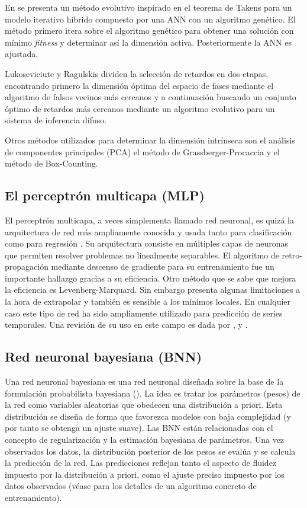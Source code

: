 \documentclass{llncs}
\begin{document}
En \cite{ferreira2008new} se presenta un método evolutivo inspirado en el teorema de Takens para un modelo iterativo híbrido compuesto por una ANN con un algoritmo genético. El método primero itera sobre el algoritmo genético para obtener una solución con mínimo \emph{fitness} y determinar así la dimensión activa. Posteriormente la ANN es ajustada. 

Lukoseviciute y Ragulskis \cite{lukoseviciute2010evolutionary} dividen la selección de retardos en dos etapas, encontrando primero la dimensión óptima del espacio de fases mediante el algoritmo de falsos vecinos más cercanos y a continuación buscando un conjunto óptimo de retardos más cercanos mediante un algoritmo evolutivo para un sistema de inferencia difuso.

Otros métodos utilizados para determinar la dimensión intrínseca son el análisis de componentes principales (PCA) el método de Grassberger-Procaccia \cite{grassberger2004measuring} y  el método de Box-Counting. 


\subsection{El perceptrón multicapa (MLP)}

El perceptrón multicapa, a veces simplementa llamado red neuronal, es quizá la arquitectura de red más ampliamente conocida y usada tanto para clasificación como para regresión \cite{bishop1995neural}. Su arquitectura consiste en múltiples capas de neuronas que permiten resolver problemas no linealmente separables. El algoritmo de retro-propagación mediante descenso de gradiente para su entrenamiento fue un importante hallazgo gracias a su eficiencia. Otro método que se sabe que mejora la eficiencia es Levenberg-Marquard. Sin embargo presenta algunas limitaciones a la hora de extrapolar y también es sensible a los mínimos locales. En cualquier caso este tipo de red ha sido ampliamente utilizado para predicción de series temporales. Una revisión de su uso en este campo es dada por \cite{hippert2001neural}, \cite{azoff1994neural} y \cite{hoptroff1993principles}.

\subsection{Red neuronal bayesiana (BNN)}
Una red neuronal bayesiana es una red neuronal diseñada sobre la base de la formulación probabilista bayesiana (\cite{mackay1992bayesian}). La idea es tratar los parámetros (pesos) de la red como variables aleatorias que obedecen una distribución a priori. Esta distribución se diseña de forma que favorezca modelos con baja complejidad (y por tanto se obtenga un ajuste suave). Las BNN están relacionadas con el concepto de regularización y la estimación bayesiana de parámetros. Una vez observados los datos, la distribución posterior de los pesos se evalúa y se calcula la predicción de la red. Las predicciones reflejan tanto el aspecto de fluidez impuesto por la distribución a priori, como el ajuste preciso impuesto por los datos observados (véase \cite{dan1997gauss} para los detalles de un algoritmo concreto de entrenamiento).
\end{document}
